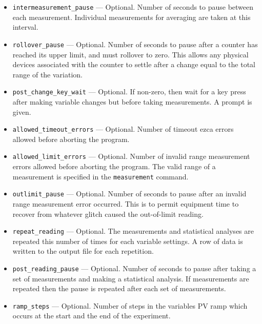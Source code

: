 \begin{itemize}
\begin{itemize}
\begin{itemize}
        \item {\verb+intermeasurement_pause+} ---  Optional. Number of seconds to pause between each measurement.
                Individual measurements for averaging are taken at this interval.
        \item {\verb+rollover_pause+} ---  Optional. Number of seconds to pause after a counter has reached
                its upper limit, and must rollover to zero. This allows any physical devices
                associated with the counter to settle after a change equal to the total range
                of the variation.
        \item {\verb+post_change_key_wait+} ---  Optional. If non-zero, then wait for a key press after
                making variable changes but before taking measurements. A prompt is given.
        \item {\verb+allowed_timeout_errors+} ---  Optional. Number of timeout ezca errors allowed before aborting the
                program. 
        \item {\verb+allowed_limit_errors+} ---  Optional. Number of invalid range measurement errors 
                allowed before aborting the
                program. The valid range of a measurement is specified in the {\verb+measurement+} command.
        \item {\verb+outlimit_pause+} ---  Optional. Number of seconds to pause after an invalid range measurement error
                occurred. This is to permit equipment time to recover from whatever glitch caused the out-of-limit
                reading.
        \item {\verb+repeat_reading+} --- Optional. The measurements and statistical analyses are repeated this number of 
                times for each variable settings. A row of data is written to the output file
                for each repetition.
        \item {\verb+post_reading_pause+} --- Optional. Number of seconds to pause after taking a 
                set of measurements and making a statistical analysis.
                If measurements are repeated then the pause is repeated after each set of measurements.
        \item {\verb+ramp_steps+} --- Optional. Number of steps in the variables PV ramp 
                which occurs at the start and the end of the experiment.


\end{itemize}
\end{itemize}
\end{itemize}
